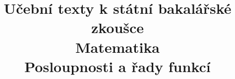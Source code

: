 \clearpage

\clearpage

\title{\LARGE Učební texty k státní bakalářské zkoušce \\ Matematika \\ Posloupnosti a řady funkcí}



\maketitle

\newpage
\setcounter{section}{2}



